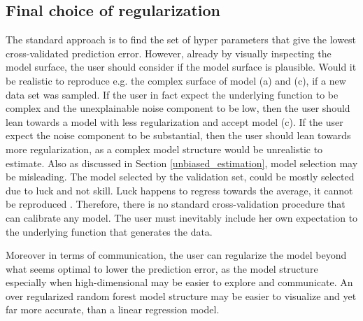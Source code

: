\subsection{Final choice of regularization}
The standard approach is to find the set of hyper parameters that give the lowest cross-validated prediction error. However, already by visually inspecting the model surface, the user should consider if the model surface is plausible.  Would it be realistic to reproduce e.g. the complex surface of model (a) and (c), if a new data set was sampled. If the user in fact expect the underlying function to be complex and the unexplainable noise component to be low, then the user should lean towards a model with less regularization and accept model (c). If the user expect the noise component to be substantial, then the user should lean towards more regularization, as a complex model structure would be unrealistic to estimate. Also as discussed in Section \ref{unbiased_estimation}, model selection may be misleading. The model selected by the validation set, could be mostly selected due to luck and not skill. Luck happens to regress towards the average, it cannot be reproduced \cite{kahneman2011thinking}. Therefore, there is no standard cross-validation procedure that can calibrate any model. The user must inevitably include her own expectation to the underlying function that generates the data.

Moreover in terms of communication, the user can regularize the model beyond what seems optimal to lower the prediction error, as the model structure especially when high-dimensional may be easier to explore and communicate. An over regularized random forest model structure may be easier to visualize and yet far more accurate, than a linear regression model.